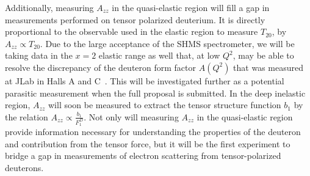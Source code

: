 Additionally, measuring $A_{zz}$ in the quasi-elastic region will fill a gap in measurements performed on tensor polarized deuterium. It is directly proportional to the observable used in the elastic region to measure $T_{20}$, 
by $A_{zz} \propto T_{20}$. Due to the large acceptance of the SHMS spectrometer, we will be taking data in the $x = 2$ elastic range as well that, at low $Q^2$, may be able to resolve the discrepancy of the deuteron form factor $A(Q^2)$ that was measured at JLab in Halls A and C~\cite{Garcon:2001sz}. This will be investigated further as a potential parasitic measurement when the full proposal is submitted.  
In the deep inelastic region, $A_{zz}$ will soon be measured to extract the tensor structure function $b_1$ by the relation $A_{zz} \propto \frac{b_1}{F_1^D}$. Not only will measuring $A_{zz}$ in the quasi-elastic region provide information necessary for understanding the properties of the deuteron and contribution from the tensor force, but it will be the first experiment to bridge a gap in measurements of electron scattering from tensor-polarized deuterons.






